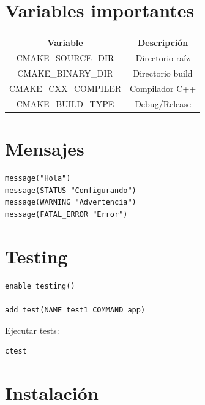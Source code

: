 \documentclass[a4paper,11pt]{article}
\begin{document}
\section*{Variables importantes}

\begin{center}
\begin{tabular}{| c | c |}
\hline
Variable & Descripción \\
\hline\hline
CMAKE\_SOURCE\_DIR & Directorio raíz \\
\hline
CMAKE\_BINARY\_DIR & Directorio build \\
\hline
CMAKE\_CXX\_COMPILER & Compilador C++ \\
\hline
CMAKE\_BUILD\_TYPE & Debug/Release \\
\hline
\end{tabular}
\end{center}


\section*{Mensajes}

\begin{lstlisting}
message("Hola")
message(STATUS "Configurando")
message(WARNING "Advertencia")
message(FATAL_ERROR "Error")
\end{lstlisting}


\section*{Testing}

\begin{lstlisting}
enable_testing()

add_test(NAME test1 COMMAND app)
\end{lstlisting}

Ejecutar tests:
\begin{lstlisting}
ctest
\end{lstlisting}


\section*{Instalación}
\end{document}
